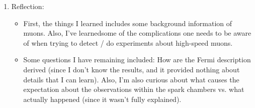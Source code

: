 \documentclass{article}
\begin{document}
\begin{enumerate}
\begin{itemize}
        \hfil

        \item The twentieth to twenty-fourth paragraphs describes the details they used for data aalysis, and some formulas involved, and some of the resulting data value.
        
        \hfil

        \item The twenty-fifth paragraph is the conclusion, describing the experimental results and the calculation they got. 
        
        \item The twenty-sixth paragraph includes some acknowledgement about how the ideals are gotten.
        
        \hfil

        \item Finally, the twenty-seventh to thirty-second paragraphs are some details on the construction of the spark chamber.
    \end{itemize}

    Unknown words:
    \begin{itemize}
        \item Antiparticle
        \item Antineutrino
        \item antimuon
        \item Fermi description
        \item boson
    \end{itemize}

    \hfil

    \item Reflection:
    
    \begin{itemize}
        \item First, the things I learned includes some background information of muons. Also, I've learnedsome of the complications one needs to be aware of when trying to detect / do experiments about high-speed muons.
        \item Some questions I have remaining included: How are the Fermi description derived (since I don't know the results, and it provided nothing about details that I can learn). Also, I'm also curious about what causes the expectation about the observations within the spark chambers vs. what actually happened (since it wasn't fully explained). 
    \end{itemize}
\end{enumerate}
\end{document}
